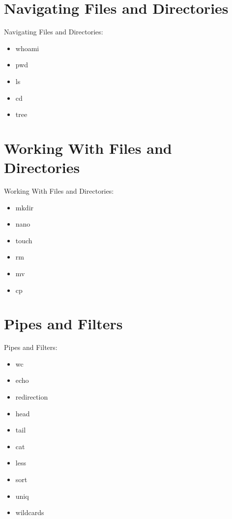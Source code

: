 \documentclass[
 size=12pt,
 paper=screen,
 mode=present,
 display=slidesnotes,
 style=paintings,
 nohandoutpagebreaks,
]{powerdot}
\begin{document}
\section[slide=false]{Navigating Files and Directories}

\begin{slide}{Navigating Files and Directories:}
  \begin{itemize}
     \item whoami
     \item pwd
     \item ls
     \item cd
     \item tree
  \end{itemize}
\end{slide}

\section[slide=false]{Working With Files and Directories}

\begin{slide}{Working With Files and Directories:}
  \begin{itemize}
     \item mkdir
     \item nano
     \item touch
     \item rm
     \item mv
     \item cp
  \end{itemize}
\end{slide}

\section[slide=false]{Pipes and Filters}

\begin{slide}{Pipes and Filters:}
  \begin{itemize}
     \item wc
     \item echo
     \item redirection
     \item head
     \item tail
     \item cat
     \item less
     \item sort
     \item uniq
     \item wildcards
  \end{itemize}
\end{slide}
\end{document}
